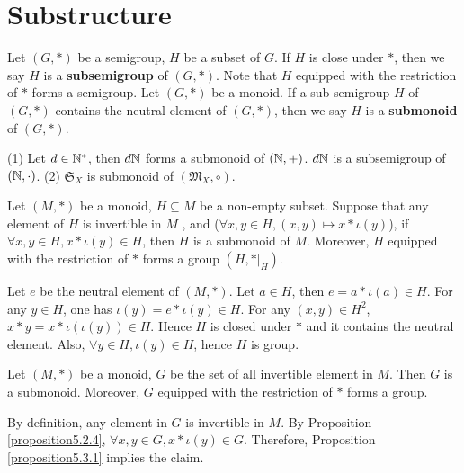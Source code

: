 \section{Substructure}
\begin{definitionenv}
    Let $(G, *)$ be a semigroup,  $H$ be a subset of $G$. If $H$ is close under $*$,  then we say $H$ is a \textbf{subsemigroup} of $(G, *)$. Note that $H$ equipped with the restriction of $*$ forms a semigroup.
    Let $(G, *)$ be a monoid. If a sub-semigroup $H$ of $(G, *)$ contains the neutral element of $(G, *)$,  then we say $H$ is a \textbf{submonoid} of $(G, *)$.
\end{definitionenv}
\begin{exampleenv}
   \quad
   \newline
   (1) Let $d\in \mathbb{N}^*$,  then $d\mathbb{N}$ forms a submonoid of $(\mathbb{N}, +)$.
   $d\mathbb{N}$ is a subsemigroup of $(\mathbb{N}, \cdot)$.
    \newline
    (2) $\mathfrak{S} _X$ is submonoid of $(\mathfrak{M} _X, \circ)$.
\end{exampleenv}
\begin{propositionenv}\label{proposition5.3.1}
    Let $(M, *)$ be a monoid,  $H\subseteq M$ be a non-empty subset. Suppose that any element of $H$ is invertible in $M$ ,  and ($\forall x, y \in H, (x, y)\mapsto x*\iota(y)$),  if $\forall x, y\in H,  x*\iota(y)\in H$,  then $H$ is a submonoid of $M$. Moreover,  $H$ equipped with the restriction of $*$ forms a group $(H, *|_H)$. 
\end{propositionenv}
\begin{proofenv}
    Let $e$ be the neutral element of $(M, *)$. Let $a\in H$,  then $e=a*\iota(a)\in H$. For any $y\in H$,  one has $\iota(y)=e*\iota(y)\in H$. For any $(x, y)\in H^2$,  $x*y=x*\iota(\iota(y))\in H$. Hence $H$ is closed under $*$ and it contains the neutral element. Also,  $\forall y\in H,  \iota(y)\in H$,  hence $H$ is group. 
\end{proofenv}
\begin{corollaryenv}
    Let $(M, *)$ be a monoid,  $G$ be the set of all invertible element in $M$. Then $G$ is a submonoid. Moreover,  $G$ equipped with the restriction of $*$ forms a group.
\end{corollaryenv}
\begin{proofenv}
    By definition,  any element in $G$ is invertible in $M$. By Proposition \ref{proposition5.2.4},  $\forall x, y\in G,  x*\iota(y)\in G$. Therefore,  Proposition \ref{proposition5.3.1} implies the claim.
\end{proofenv}

